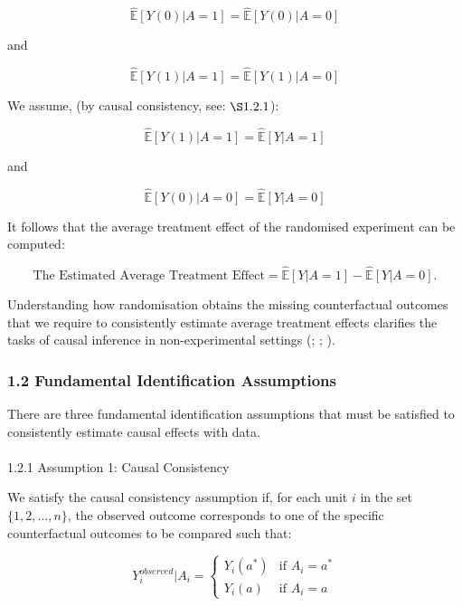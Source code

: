 \documentclass[
  singlecolumn]{article}
\makeatletter
\let\oldparagraph\paragraph
\renewcommand{\paragraph}{
    \@ifstar
      \xxxParagraphStar
      \xxxParagraphNoStar
  }
\newcommand{\xxxParagraphStar}[1]{\oldparagraph*{#1}\mbox{}}
\newcommand{\xxxParagraphNoStar}[1]{\oldparagraph{#1}\mbox{}}
\makeatother
\begin{document}
\[
\widehat{\mathbb{E}}[Y(0) | A = 1] = \widehat{\mathbb{E}}[Y(0) | A = 0]
\]

and

\[
\widehat{\mathbb{E}}[Y(1) | A = 1] = \widehat{\mathbb{E}}[Y(1) | A = 0]
\]

We assume, (by causal consistency, see: \(\S 1.2.1\)):

\[\widehat{\mathbb{E}}[Y(1) | A = 1] = \widehat{\mathbb{E}}[Y| A = 1]\]

and

\[\widehat{\mathbb{E}}[Y(0) | A = 0] = \widehat{\mathbb{E}}[Y| A = 0]\]

It follows that the average treatment effect of the randomised
experiment can be computed:

\[
\text{The Estimated Average Treatment Effect} = \widehat{\mathbb{E}}[Y | A = 1] - \widehat{\mathbb{E}}[Y | A = 0].
\]

Understanding how randomisation obtains the missing counterfactual
outcomes that we require to consistently estimate average treatment
effects clarifies the tasks of causal inference in non-experimental
settings (;
;
).

\subsubsection{1.2 Fundamental Identification
Assumptions}\label{fundamental-identification-assumptions}

There are three fundamental identification assumptions that must be
satisfied to consistently estimate causal effects with data.

\paragraph{1.2.1 Assumption 1: Causal
Consistency}\label{assumption-1-causal-consistency}

We satisfy the causal consistency assumption if, for each unit \(i\) in
the set \(\{1, 2, \ldots, n\}\), the observed outcome corresponds to one
of the specific counterfactual outcomes to be compared such that:

\[
Y_i^{observed}|A_i = 
\begin{cases} 
Y_i(a^*) & \text{if } A_i = a^* \\
Y_i(a) & \text{if } A_i = a
\end{cases}
\]
\end{document}
